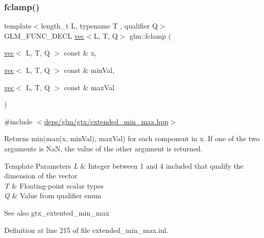 \mbox{\label{group__gtx__extended__min__max_ga5c15fa4709763c269c86c0b8b3aa2297}} 
\subsubsection{\texorpdfstring{fclamp()}{fclamp()}\hspace{0.1cm}{\footnotesize\ttfamily [3/3]}}
{\footnotesize\ttfamily template$<$length\+\_\+t L, typename T , qualifier Q$>$ \\
G\+L\+M\+\_\+\+F\+U\+N\+C\+\_\+\+D\+E\+CL \hyperlink{structglm_1_1vec}{vec}$<$L, T, Q$>$ glm\+::fclamp (\begin{DoxyParamCaption}\item[{\hyperlink{structglm_1_1vec}{vec}$<$ L, T, Q $>$ const \&}]{x,  }\item[{\hyperlink{structglm_1_1vec}{vec}$<$ L, T, Q $>$ const \&}]{min\+Val,  }\item[{\hyperlink{structglm_1_1vec}{vec}$<$ L, T, Q $>$ const \&}]{max\+Val }\end{DoxyParamCaption})}



{\ttfamily \#include $<$\hyperlink{extended__min__max_8hpp}{deps/glm/gtx/extended\+\_\+min\+\_\+max.\+hpp}$>$}

Returns min(max(x, min\+Val), max\+Val) for each component in x. If one of the two arguments is NaN, the value of the other argument is returned.


\begin{DoxyTemplParams}{Template Parameters}
{\em L} & Integer between 1 and 4 included that qualify the dimension of the vector \\
\hline
{\em T} & Floating-\/point scalar types \\
\hline
{\em Q} & Value from qualifier enum\\
\hline
\end{DoxyTemplParams}
\begin{DoxySeeAlso}{See also}
gtx\+\_\+extented\+\_\+min\+\_\+max 
\end{DoxySeeAlso}


Definition at line 215 of file extended\+\_\+min\+\_\+max.\+inl.

